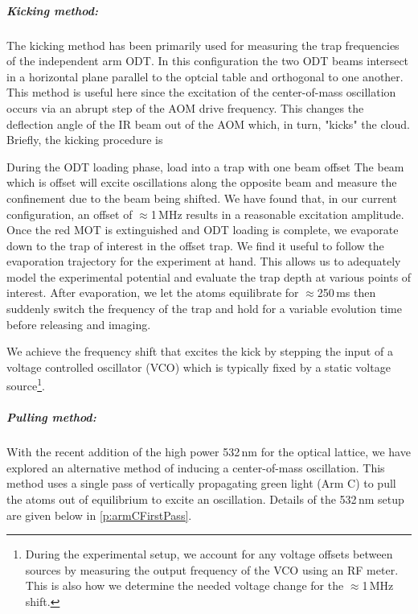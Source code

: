 \subparagraph{Kicking method:}
The kicking method has been primarily used for measuring the trap frequencies of the independent arm ODT.
In this configuration the two ODT beams  intersect in a horizontal plane parallel to the optcial table and orthogonal to one another.
This method is useful here since the excitation of the center-of-mass oscillation occurs via an abrupt step of the AOM drive frequency.
This changes the deflection angle of the IR beam out of the AOM which, in turn, "kicks" the cloud.
Briefly, the kicking procedure is 
\begin{outline}[enumerate]
	\1 During the ODT loading phase, load into a trap with one beam offset
		\2 The beam which is offset will excite oscillations along the opposite beam and measure the confinement due to the beam being shifted.
		\2 We have found that, in our current configuration, an offset of $\approx$1\,MHz results in a reasonable excitation amplitude.
	\1 Once the red MOT is extinguished and ODT loading is complete, we evaporate down to the trap of interest in the offset trap.
		\2 We find it useful to follow the evaporation trajectory for the experiment at hand. This allows us to adequately model the experimental potential and evaluate the trap depth at various points of interest.
	\1 After evaporation, we let the atoms equilibrate for $\approx$250\,ms then suddenly switch the frequency of the trap and hold for a variable evolution time before releasing and imaging.
\end{outline}
We achieve the frequency shift that excites the kick by stepping the input of a voltage controlled oscillator (VCO) which is typically fixed by a static voltage source\footnote{
During the experimental setup, we account for any voltage offsets between sources by measuring the output frequency of the VCO using an RF meter.
This is also how we determine the needed voltage change for the $\approx$1\,MHz shift.}.

\subparagraph{Pulling method:}
With the recent addition of the high power 532\,nm for the optical lattice, we have explored an alternative method of inducing a center-of-mass oscillation. 
This method uses a single pass of vertically propagating green light (Arm C) to pull the atoms out of equilibrium to excite an oscillation.
Details of the 532\,nm setup are given below in \ref{p:armCFirstPass}.

